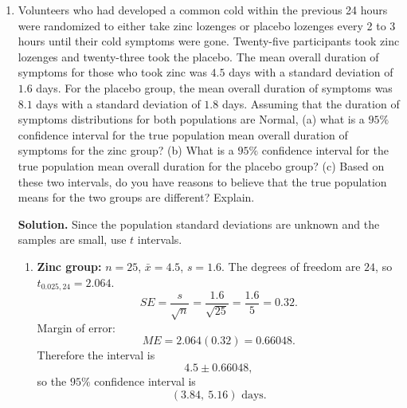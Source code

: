 \documentclass[12pt]{article}
\begin{document}
\begin{enumerate}[label=(\arabic*), leftmargin=*]
\begin{enumerate}[label=(\alph*)]
    \item Here
    \[
    \hat p=\frac{355}{1000}=0.355.
    \]
    Then
    \[
    SE=\sqrt{\frac{(0.355)(0.645)}{1000}}=\sqrt{\frac{0.228975}{1000}}=\sqrt{0.000228975}\approx 0.01513.
    \]
    So the margin of error is
    \[
    E=2.576(0.01513)\approx 0.03898\approx 0.0390.
    \]

    \item Here
    \[
    \hat p=\frac{520}{650}=0.80.
    \]
    Then
    \[
    SE=\sqrt{\frac{(0.80)(0.20)}{650}}=\sqrt{\frac{0.16}{650}}=\sqrt{0.00024615}\approx 0.01569.
    \]
    So the margin of error is
    \[
    E=2.576(0.01569)\approx 0.04042\approx 0.0404.
    \]
\end{enumerate}

\item Volunteers who had developed a common cold within the previous 24 hours were randomized to either take zinc lozenges or placebo lozenges every 2 to 3 hours until their cold symptoms were gone. Twenty-five participants took zinc lozenges and twenty-three took the placebo. The mean overall duration of symptoms for those who took zinc was $4.5$ days with a standard deviation of $1.6$ days. For the placebo group, the mean overall duration of symptoms was $8.1$ days with a standard deviation of $1.8$ days. Assuming that the duration of symptoms distributions for both populations are Normal, (a) what is a $95\%$ confidence interval for the true population mean overall duration of symptoms for the zinc group? (b) What is a $95\%$ confidence interval for the true population mean overall duration for the placebo group? (c) Based on these two intervals, do you have reasons to believe that the true population means for the two groups are different? Explain.

\par\medskip
\noindent\textbf{Solution.}
Since the population standard deviations are unknown and the samples are small, use $t$ intervals.

\begin{enumerate}[label=(\alph*)]
    \item \textbf{Zinc group:} $n=25$, $\bar x=4.5$, $s=1.6$. The degrees of freedom are $24$, so $t_{0.025,24}=2.064$.
    \[
    SE=\frac{s}{\sqrt n}=\frac{1.6}{\sqrt{25}}=\frac{1.6}{5}=0.32.
    \]
    Margin of error:
    \[
    ME=2.064(0.32)=0.66048.
    \]
    Therefore the interval is
    \[
    4.5\pm 0.66048,
    \]
    so the $95\%$ confidence interval is
    \[
    (3.84,\ 5.16)\text{ days}.
    \]


\end{enumerate}
\end{enumerate}
\end{document}
